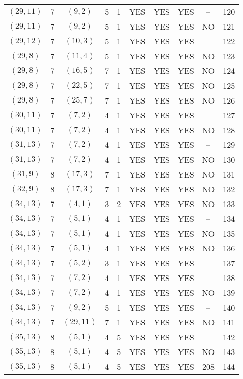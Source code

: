 \begin{longtable}{|c|c|c|c|c|c|c|c|c|c|}
$(29, 11)$ & 7 & $(9, 2)$ & 5 & 1 & YES & YES & YES & -- & 120\\
$(29, 11)$ & 7 & $(9, 2)$ & 5 & 1 & YES & YES & YES & NO & 121\\
$(29, 12)$ & 7 & $(10, 3)$ & 5 & 1 & YES & YES & YES & -- & 122\\
$(29, 8)$ & 7 & $(11, 4)$ & 5 & 1 & YES & YES & YES & NO & 123\\
$(29, 8)$ & 7 & $(16, 5)$ & 7 & 1 & YES & YES & YES & NO & 124\\
$(29, 8)$ & 7 & $(22, 5)$ & 7 & 1 & YES & YES & YES & NO & 125\\
$(29, 8)$ & 7 & $(25, 7)$ & 7 & 1 & YES & YES & YES & NO & 126\\
$(30, 11)$ & 7 & $(7, 2)$ & 4 & 1 & YES & YES & YES & -- & 127\\
$(30, 11)$ & 7 & $(7, 2)$ & 4 & 1 & YES & YES & YES & NO & 128\\
$(31, 13)$ & 7 & $(7, 2)$ & 4 & 1 & YES & YES & YES & -- & 129\\
$(31, 13)$ & 7 & $(7, 2)$ & 4 & 1 & YES & YES & YES & NO & 130\\
$(31, 9)$ & 8 & $(17, 3)$ & 7 & 1 & YES & YES & YES & NO & 131\\
$(32, 9)$ & 8 & $(17, 3)$ & 7 & 1 & YES & YES & YES & NO & 132\\
$(34, 13)$ & 7 & $(4, 1)$ & 3 & 2 & YES & YES & YES & NO & 133\\
$(34, 13)$ & 7 & $(5, 1)$ & 4 & 1 & YES & YES & YES & -- & 134\\
$(34, 13)$ & 7 & $(5, 1)$ & 4 & 1 & YES & YES & YES & NO & 135\\
$(34, 13)$ & 7 & $(5, 1)$ & 4 & 1 & YES & YES & YES & NO & 136\\
$(34, 13)$ & 7 & $(5, 2)$ & 3 & 1 & YES & YES & YES & -- & 137\\
$(34, 13)$ & 7 & $(7, 2)$ & 4 & 1 & YES & YES & YES & -- & 138\\
$(34, 13)$ & 7 & $(7, 2)$ & 4 & 1 & YES & YES & YES & NO & 139\\
$(34, 13)$ & 7 & $(9, 2)$ & 5 & 1 & YES & YES & YES & -- & 140\\
$(34, 13)$ & 7 & $(29, 11)$ & 7 & 1 & YES & YES & YES & NO & 141\\
$(35, 13)$ & 8 & $(5, 1)$ & 4 & 5 & YES & YES & YES & -- & 142\\
$(35, 13)$ & 8 & $(5, 1)$ & 4 & 5 & YES & YES & YES & NO & 143\\
$(35, 13)$ & 8 & $(5, 1)$ & 4 & 5 & YES & YES & YES & 208 & 144\\

\end{longtable}
